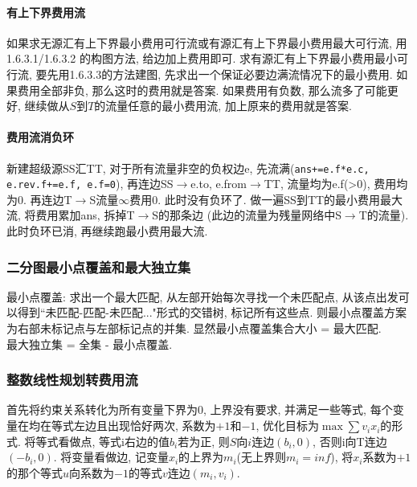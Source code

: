 \paragraph{有上下界费用流}
如果求无源汇有上下界最小费用可行流或有源汇有上下界最小费用最大可行流, 用1.6.3.1/1.6.3.2 的构图方法, 给边加上费用即可. 
求有源汇有上下界最小费用最小可行流, 要先用1.6.3.3的方法建图, 先求出一个保证必要边满流情况下的最小费用. 如果费用全部非负, 那么这时的费用就是答案. 如果费用有负数, 那么流多了可能更好, 继续做从$S$到$T$的流量任意的最小费用流, 加上原来的费用就是答案. 
\paragraph{费用流消负环}
新建超级源SS汇TT, 对于所有流量非空的负权边e, 先流满(\texttt{ans+=e.f*e.c, e.rev.f+=e.f, e.f=0}), 再连边SS$\to$e.to, e.from$\to$TT, 流量均为e.f(>0), 费用均为0. 再连边T$\to$S流量$\infty$费用0. 此时没有负环了. 做一遍SS到TT的最小费用最大流, 将费用累加ans, 拆掉T$\to$S的那条边 (此边的流量为残量网络中S$\to$T的流量). 此时负环已消, 再继续跑最小费用最大流.
\subsubsection{二分图最小点覆盖和最大独立集}
\noindent
最小点覆盖: 求出一个最大匹配, 从左部开始每次寻找一个未匹配点, 从该点出发可以得到``未匹配-匹配-未匹配..."形式的交错树, 标记所有这些点. 则最小点覆盖方案为右部未标记点与左部标记点的并集. 显然最小点覆盖集合大小 = 最大匹配.\\
最大独立集 = 全集 - 最小点覆盖.

\subsubsection{整数线性规划转费用流}
\noindent
首先将约束关系转化为所有变量下界为$0$, 上界没有要求, 并满足一些等式,
每个变量在均在等式左边且出现恰好两次, 系数为$+1$和$-1$, 优化目标为$\max\sum v_ix_i$的形式.
将等式看做点, 等式i右边的值$b_i$若为正, 则$S$向$i$连边$(b_i, 0)$, 否则i向T连边$(-b_i, 0)$.
将变量看做边, 记变量$x_i$的上界为$m_i$(无上界则$m_i=inf$), 将$x_i$系数为$+1$的那个等式$u$向系数为$-1$的等式$v$连边$(m_i, v_i)$.